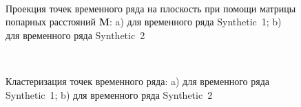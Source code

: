 \begin{figure}[h!t]\center
{}
\\
\caption{Проекция точек временного ряда на плоскость при помощи матрицы попарных расстояний $\textbf{M}$: a) для временного ряда Synthetic~1; b) для временного ряда Synthetic~2}
\label{fig_synthetic_2D}
\end{figure}

\begin{figure}[h!t]\center
{}
\\
\caption{Кластеризация точек временного ряда: a) для временного ряда Synthetic~1; b) для временного ряда Synthetic~2}
\label{fig_synthetic_claster}
\end{figure}


